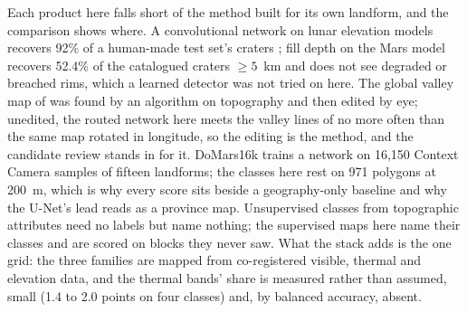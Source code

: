 Each product here falls short of the method built for its own landform, and the comparison shows where. A
convolutional network on lunar elevation models recovers 92\% of a human-made test set's craters
\citep{Silburt2019}; fill depth on the Mars model recovers 52.4\% of the catalogued craters $\ge5$~km and does not see
degraded or breached rims, which a learned detector was not tried on here. The global valley map of \citet{Luo2009}
was found by an algorithm on topography and then edited by eye; unedited, the routed network here meets the valley
lines of \citet{Alemanno2018} no more often than the same map rotated in longitude, so the editing is the method, and
the candidate review stands in for it. DoMars16k \citep{Wilhelm2020} trains a network on 16,150 Context Camera samples
of fifteen landforms; the classes here rest on 971 polygons at 200~m, which is why every score sits beside a
geography-only baseline and why the U-Net's lead reads as a province map. Unsupervised classes from topographic
attributes \citep{Bue2006} need no labels but name nothing; the supervised maps here name their classes and are scored
on blocks they never saw. What the stack adds is the one grid: the three families are mapped from co-registered
visible, thermal and elevation data, and the thermal bands' share is measured rather than assumed, small (1.4 to 2.0
points on four classes) and, by balanced accuracy, absent.

